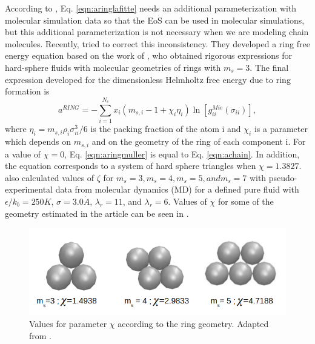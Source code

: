 	According to , Eq. \eqref{eqn:aringlafitte} needs an additional parameterization with molecular simulation data so that the EoS can  be used in molecular simulations, but this additional parameterization is not necessary when we are modeling chain molecules. Recently,  tried to correct this inconsistency. They developed a ring free energy equation based on the work of , who obtained rigorous expressions for hard-sphere fluids with molecular geometries of rings with $m_s=3$. The final expression developed for the dimensionless Helmholtz free energy due to ring formation is
	\begin{equation}
	a^{RING} =-\sum_{i=1}^{N_{c}} x_{i}\left (m_{s,i}-1+\chi_{i}\eta_{i} \right )\ln \left [g_{ii}^{Mie}(\sigma_{ii}) \right] ,
	\label{eqn:aringmuller}
	\end{equation}
	where $\eta_{i}=m_{s,i}\rho_{i}\sigma_{ii}^{3}/6$ is the packing fraction of the atom i and $\chi_{i}$ is a parameter which depends on $m_{s,i}$ and on the geometry of the ring of each component i. For a value of $\chi=0$, Eq. \eqref{eqn:aringmuller} is equal to Eq. \eqref{eqn:achain}. In addition, the equation corresponds to a system of hard sphere triangles when $\chi=1.3827$.  also calculated values of $\zeta$ for $m_{s}=3,m_{s}=4,m_{s}=5, and m_{s}=7$ with pseudo-experimental data from molecular dynamics (MD) for a defined pure fluid with $\epsilon/k_{b} = 250 K$, $\sigma = 3.0 \dot{A}$, $\lambda_{r} = 11$, and $\lambda_{r} = 6$. Values of $\chi$  for some of the geometry estimated in the article can be seen in .
	\begin{figure}[th]
		\centering
		\includegraphics[scale=0.5]{Figures/mullergeo.png}
		\caption{Values for parameter $\chi$ according to the ring geometry. Adapted from .}
		\label{ringqsi}
	\end{figure}

